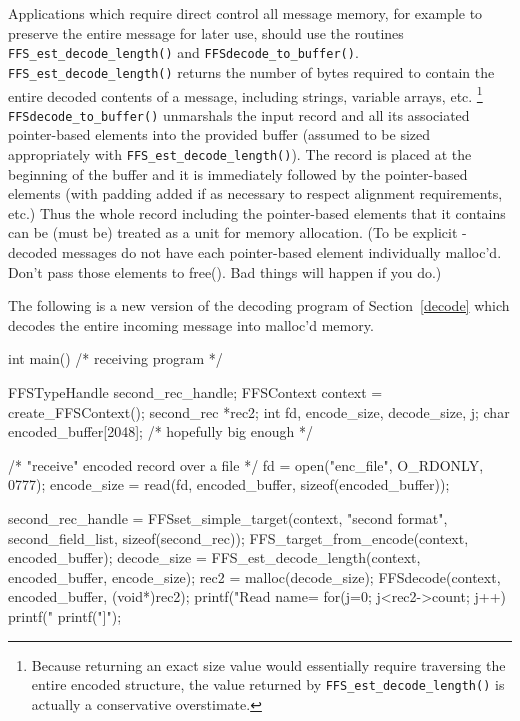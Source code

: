 Applications which require direct control all message memory, for example to
preserve the entire message for later use, should use the routines
{\tt  FFS\_est\_decode\_length()} and {\tt FFSdecode\_to\_buffer()}.
{\tt  FFS\_est\_decode\_length()} returns the number of bytes required to
contain the entire decoded contents of a message, including strings,
variable arrays, etc.  \footnote{Because returning an exact size value would
essentially require traversing the entire encoded structure, the value
returned by {\tt FFS\_est\_decode\_length()} is actually a conservative
overstimate.}  {\tt FFSdecode\_to\_buffer()} unmarshals the input record and
all its associated pointer-based elements into the provided buffer (assumed
to be sized appropriately with {\tt FFS\_est\_decode\_length()}).  The
record is placed at the beginning of the buffer and it is immediately
followed by the pointer-based elements (with padding added if as necessary
to respect alignment requirements, etc.)   Thus the whole record including
the pointer-based elements that it contains can be (must be) treated as a unit  
for memory allocation.  (To be explicit - decoded messages do not have each
pointer-based element individually malloc'd.  Don't pass those elements to
free().  Bad things will happen if you do.)

The following is a new version of the decoding program of
Section~\ref{decode} which decodes the entire incoming message into malloc'd
memory.
\begin{Code}
int main()     /* receiving program */
{
    FFSTypeHandle second_rec_handle;
    FFSContext context = create_FFSContext();
    second_rec *rec2;
    int fd, encode_size, decode_size, j;
    char encoded_buffer[2048];  /* hopefully big enough */

    /* "receive" encoded record over a file */
    fd = open("enc_file", O_RDONLY, 0777);
    encode_size = read(fd, encoded_buffer, sizeof(encoded_buffer));

    second_rec_handle = FFSset_simple_target(context, "second format", second_field_list, sizeof(second_rec));
   FFS_target_from_encode(context, encoded_buffer);
    decode_size = FFS_est_decode_length(context, encoded_buffer, encode_size);
    rec2 = malloc(decode_size);
    FFSdecode(context, encoded_buffer, (void*)rec2);
    printf("Read name=%
    for(j=0; j<rec2->count; j++) printf("%
    printf("]\n");
}
\end{Code}

